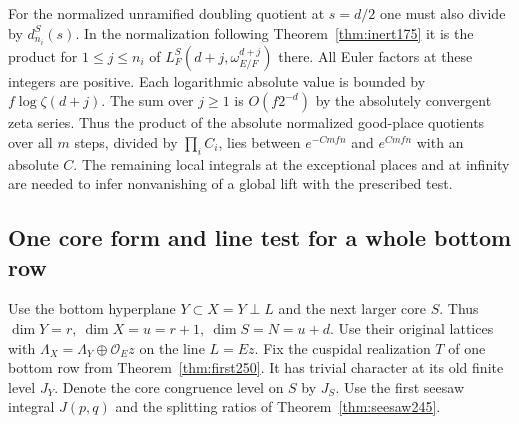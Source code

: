 \documentclass[a4paper,11pt]{article}
\theoremstyle{definition}
\theoremstyle{remark}
\numberwithin{equation}{section}
\begin{document}
For the normalized unramified doubling quotient at \(s=d/2\) one must
also divide by \(d_{n_i}^S(s)\). In the normalization following
Theorem~\ref{thm:inert175} it is the product for \(1\le j\le n_i\) of
\(L_F^S(d+j,\omega_{E/F}^{d+j})\) there. All Euler factors at these
integers are positive. Each logarithmic absolute value is bounded by
\(f\log\zeta(d+j)\). The sum over \(j\ge1\) is \(O(f2^{-d})\)
by the absolutely convergent zeta series. Thus the product of the
absolute normalized good-place quotients over all \(m\) steps, divided
by \(\prod_i C_i\), lies between \(e^{-C m f n}\) and \(e^{C m f n}\)
with an absolute \(C\). The remaining local integrals at the exceptional
places and at infinity are needed to infer nonvanishing of a global
lift with the prescribed test.

\subsection{One core form and line test for a whole bottom row}\label{nav:III-42}
Use the bottom hyperplane \(Y\subset X=Y\perp L\) and the next
larger core \(S\). Thus \(\dim Y=r,\ \dim X=u=r+1,\ \dim S=N=u+d\).
Use their original lattices with
\(\Lambda_X=\Lambda_Y\oplus\mathcal O_E z\) on the line \(L=Ez\).
Fix the cuspidal realization \(T\) of one bottom row from
Theorem~\ref{thm:first250}. It has trivial character at its old
finite level \(J_Y\). Denote the core congruence level on \(S\)
by \(J_S\). Use the first seesaw integral \(J(p,q)\) and the
splitting ratios of Theorem~\ref{thm:seesaw245}.
\end{document}
